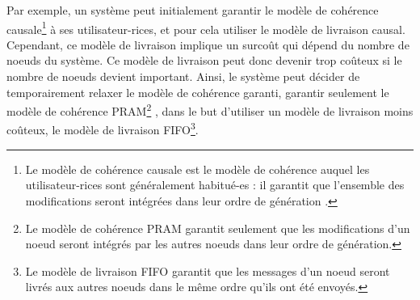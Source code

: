 Par exemple, un système peut initialement garantir le modèle de cohérence causale\footnote{Le modèle de cohérence causale est le modèle de cohérence auquel les utilisateur-rices sont généralement habitué-es : il garantit que l'ensemble des modifications seront intégrées dans leur ordre de génération .} à ses utilisateur-rices, et pour cela utiliser le modèle de livraison causal.
Cependant, ce modèle de livraison implique un surcoût qui dépend du nombre de noeuds du système.
Ce modèle de livraison peut donc devenir trop coûteux si le nombre de noeuds devient important.
Ainsi, le système peut décider de temporairement relaxer le modèle de cohérence garanti, \eg garantir seulement le modèle de cohérence PRAM\footnote{Le modèle de cohérence PRAM garantit seulement que les modifications d'un noeud seront intégrés par les autres noeuds dans leur ordre de génération.} \cite{1988-pram-lipton}, dans le but d'utiliser un modèle de livraison moins coûteux, \eg le modèle de livraison FIFO\footnote{Le modèle de livraison FIFO garantit que les messages d'un noeud seront livrés aux autres noeuds dans le même ordre qu'ils ont été envoyés.}.
